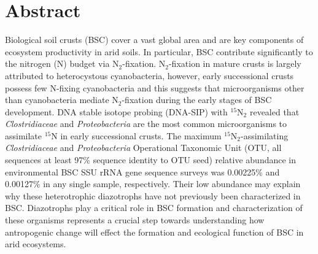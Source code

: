\section{Abstract}
Biological soil crusts (BSC) cover a vast global area and are key
components of ecosystem productivity in arid soils. In particular, BSC
contribute significantly to the nitrogen (N) budget
via N$_{2}$-fixation.  N$_{2}$-fixation in mature crusts is largely
attributed to heterocystous cyanobacteria, however, early successional
crusts possess few N-fixing cyanobacteria and this
suggests that microorganisms other than cyanobacteria mediate
N$_{2}$-fixation during the early stages of BSC development. DNA stable
isotope probing (DNA-SIP) with $^{15}$N$_{2}$ revealed that
\textit{Clostridiaceae} and \textit{Proteobacteria} are the most common
microorganisms to assimilate $^{15}$N in early successional 
crusts.  The maximum $^{15}$N$_{2}$-assimilating \textit{Clostridiaceae} and
\textit{Proteobacteria} Operational Taxonomic Unit (OTU, all sequences at 
least 97\% sequence identity to OTU seed) relative abundance in environmental
BSC SSU rRNA gene sequence surveys was 0.00225\% and 0.00127\% in any single
sample, respectively. Their low abundance may explain why these heterotrophic
diazotrophs have not previously been characterized in BSC. Diazotrophs play a
critical role in BSC formation and characterization of these organisms
represents a crucial step towards understanding how antropogenic change will
effect the formation and ecological function of BSC in arid ecosystems.


